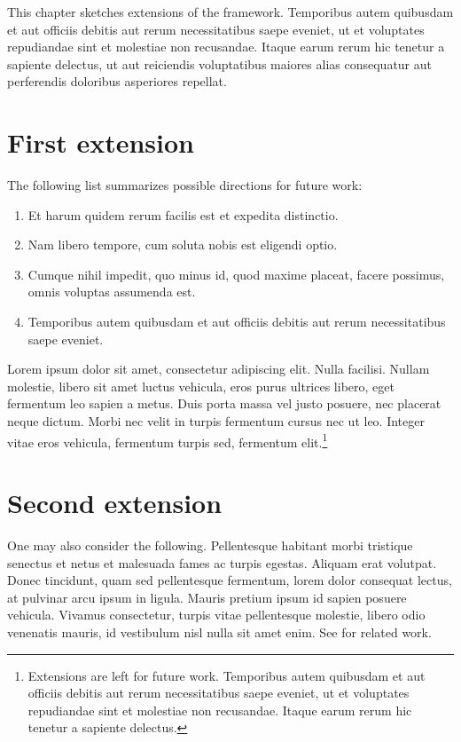 This chapter sketches extensions of the framework. Temporibus autem quibusdam et aut officiis debitis aut rerum necessitatibus saepe eveniet, ut et voluptates repudiandae sint et molestiae non recusandae. Itaque earum rerum hic tenetur a sapiente delectus, ut aut reiciendis voluptatibus maiores alias consequatur aut perferendis doloribus asperiores repellat.

\section{First extension}\label{s:extensions}

The following list summarizes possible directions for future work:
\begin{enumerate}
\item Et harum quidem rerum facilis est et expedita distinctio.
\item Nam libero tempore, cum soluta nobis est eligendi optio.
\item Cumque nihil impedit, quo minus id, quod maxime placeat, facere possimus, omnis voluptas assumenda est.
\item Temporibus autem quibusdam et aut officiis debitis aut rerum necessitatibus saepe eveniet.
\end{enumerate}
Lorem ipsum dolor sit amet, consectetur adipiscing elit. Nulla facilisi. Nullam molestie, libero sit amet luctus vehicula, eros purus ultrices libero, eget fermentum leo sapien a metus. Duis porta massa vel justo posuere, nec placerat neque dictum. Morbi nec velit in turpis fermentum cursus nec ut leo. Integer vitae eros vehicula, fermentum turpis sed, fermentum elit.\footnote{Extensions are left for future work. Temporibus autem quibusdam et aut officiis debitis aut rerum necessitatibus saepe eveniet, ut et voluptates repudiandae sint et molestiae non recusandae. Itaque earum rerum hic tenetur a sapiente delectus.}

\section{Second extension}

One may also consider the following. Pellentesque habitant morbi tristique senectus et netus et malesuada fames ac turpis egestas. Aliquam erat volutpat. Donec tincidunt, quam sed pellentesque fermentum, lorem dolor consequat lectus, at pulvinar arcu ipsum in ligula. Mauris pretium ipsum id sapien posuere vehicula. Vivamus consectetur, turpis vitae pellentesque molestie, libero odio venenatis mauris, id vestibulum nisl nulla sit amet enim. See \citet{LMS18a,LMS18b} for related work.

